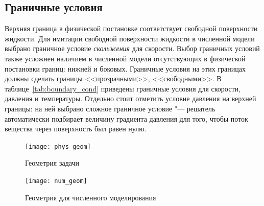 \subsection{Граничные условия}
Верхняя граница в физической постановке соответствует свободной поверхности жидкости. Для имитации свободной поверхности жидкости в численной модели выбрано граничное условие \emph{скольжения} для скорости. Выбор граничных условий также усложнен наличием в численной модели отсутствующих в физической постановки границ: нижней и боковых. Граничные условия на этих границах должны сделать границы <<прозрачными>>, <<свободными>>. В таблице~\ref{tab:boundary_cond} приведены граничные условия для скорости, давления и температуры. Отдельно стоит отметить условие давления на верхней границы: на ней выбрано сложное граничное условие "--- решатель автоматически подбирает величину градиента давления для того, чтобы поток вещества через поверхность был равен нулю. 
\begin{figure}[t]
\parbox[t]{0.4\linewidth}{
\centering\texttt{[image: phys\_geom]}
\caption{Геометрия задачи} \label{fig:phys_geom}
}
\hfill
\parbox[t]{0.45\linewidth}{
\centering\texttt{[image: num\_geom]}
\caption{Геометрия для численного моделирования} \label{fig:num_geom}
}
\end{figure}

